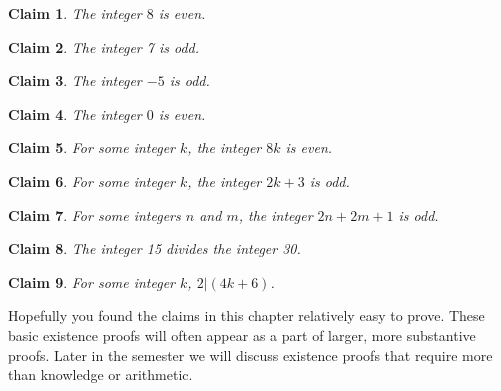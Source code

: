 \documentclass[12 pt]{article}
\theoremstyle{definition}
\theoremstyle{plain}
\theoremstyle{mytheorem}
\newtheorem{claim}{Claim}
\theoremstyle{myexample}
\theoremstyle{mydefinition}
\begin{document}
\begin{claim} The integer $8$ is even.
\end{claim}

\begin{claim} The integer 7 is odd.
\end{claim}

\begin{claim} The integer $-5$ is odd.
\end{claim}

\begin{claim} The integer $0$ is even.
\end{claim}

\begin{claim}  For some integer $k$, the integer $8k$ is even.
\end{claim}

\begin{claim} For some integer $k$, the integer $2k+3$ is odd.
\end{claim}

\begin{claim} For some integers $n$ and $m$, the integer $2n+2m+1$ is odd.
\end{claim}

\begin{claim} The integer 15 divides the integer 30.
\end{claim}

\begin{claim} For some integer $k$, $2|(4k+6)$.
\end{claim}

\noindent Hopefully you found the claims in this chapter relatively easy to prove.  These basic existence proofs will often appear as a part of larger, more substantive proofs.  Later in the semester we will discuss existence proofs that require more than knowledge or arithmetic.
\end{document}
